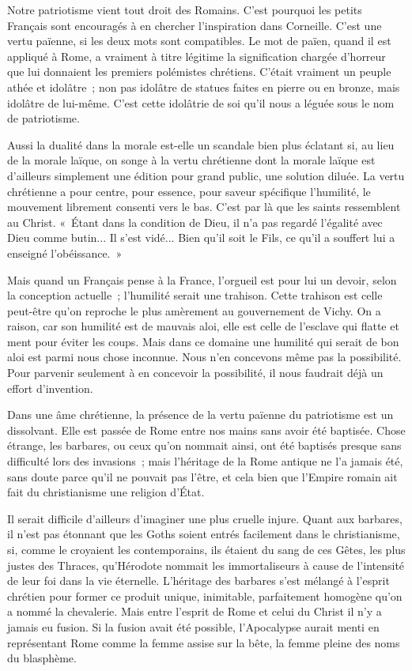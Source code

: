 \documentclass[french,twoside]{book} %
\begin{document}
Notre patriotisme vient tout droit des Romains. C'est pourquoi les petits Français sont encouragés à en chercher l'inspiration dans Corneille. C'est une vertu païenne, si les deux mots sont compatibles. Le mot de païen, quand il est appliqué à Rome, a vraiment à titre légitime la signification chargée d'horreur que lui donnaient les premiers polémistes chrétiens. C'était vraiment un peuple athée et idolâtre ; non pas idolâtre de statues faites en pierre ou en bronze, mais idolâtre de lui-même. C'est cette idolâtrie de soi qu'il nous a léguée sous le nom de patriotisme.\par
Aussi la dualité dans la morale est-elle un scandale bien plus éclatant si, au lieu de la morale laïque, on songe à la vertu chrétienne dont la morale laïque est d'ailleurs simplement une édition pour grand public, une solution diluée. La vertu chrétienne a pour centre, pour essence, pour saveur spécifique l'humilité, le mouvement librement consenti vers le bas. C'est par là que les saints ressemblent au Christ. « Étant dans la condition de Dieu, il n'a pas regardé l'égalité avec Dieu comme butin... Il s'est vidé... Bien qu'il soit le Fils, ce qu'il a souffert lui a enseigné l'obéissance. »\par
Mais quand un Français pense à la France, l'orgueil est pour lui un devoir, selon la conception actuelle ; l'humilité serait une trahison. Cette trahison est celle peut-être qu'on reproche le plus amèrement au gouvernement de Vichy. On a raison, car son humilité est de mauvais aloi, elle est celle de l'esclave qui flatte et ment pour éviter les coups. Mais dans ce domaine une humilité qui serait de bon aloi est parmi nous chose inconnue. Nous n'en concevons même pas la possibilité. Pour parvenir seulement à en concevoir la possibilité, il nous faudrait déjà un effort d'invention.\par
Dans une âme chrétienne, la présence de la vertu païenne du patriotisme est un dissolvant. Elle est passée de Rome entre nos mains sans avoir été baptisée. Chose étrange, les barbares, ou ceux qu'on nommait ainsi, ont été baptisés presque sans difficulté lors des invasions ; mais l'héritage de la Rome antique ne l'a jamais été, sans doute parce qu'il ne pouvait pas l'être, et cela bien que l'Empire romain ait fait du christianisme une religion d'État.\par
Il serait difficile d'ailleurs d'imaginer une plus cruelle injure. Quant aux barbares, il n'est pas étonnant que les Goths soient entrés facilement dans le christianisme, si, comme le croyaient les contemporains, ils étaient du sang de ces Gêtes, les plus justes des Thraces, qu'Hérodote nommait les immortaliseurs à cause de l'intensité de leur foi dans la vie éternelle. L'héritage des barbares s'est mélangé à l'esprit chrétien pour former ce produit unique, inimitable, parfaitement homogène qu'on a nommé la chevalerie. Mais entre l'esprit de Rome et celui du Christ il n'y a jamais eu fusion. Si la fusion avait été possible, l'Apocalypse aurait menti en représentant Rome comme la femme assise sur la bête, la femme pleine des noms du blasphème.\par
\end{document}
